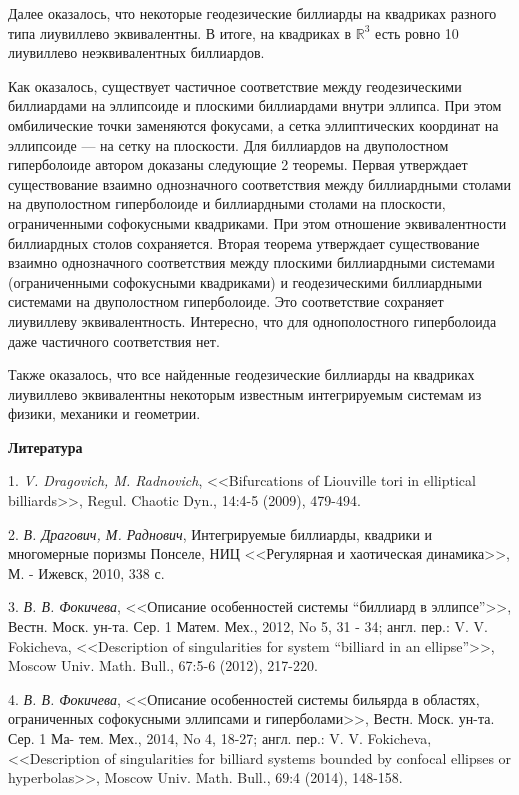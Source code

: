 Далее оказалось, что  некоторые геодезические биллиарды на квадриках разного типа лиувиллево эквивалентны.
В итоге, на квадриках в $\mathbb{R}^3$ есть ровно 10 лиувиллево неэквивалентных биллиардов.



Как оказалось, существует частичное соответствие между геодезическими биллиардами на эллипсоиде и плоскими биллиардами
внутри эллипса. При этом омбилические точки заменяются фокусами, а сетка эллиптических координат на
эллипсоиде  --- на сетку на плоскости. Для биллиардов на двуполостном гиперболоиде
автором  доказаны следующие 2 теоремы. Первая утверждает существование взаимно однозначного соответствия между
биллиардными столами на двуполостном гиперболоиде и биллиардными столами на плоскости, ограниченными софокусными квадриками. При этом
отношение эквивалентности биллиардных столов сохраняется. Вторая теорема утверждает существование
взаимно однозначного соответствия между плоскими биллиардными системами (ограниченными софокусными квадриками) и геодезическими биллиардными
системами на
двуполостном гиперболоиде. Это соответствие сохраняет лиувиллеву эквивалентность.
Интересно, что для однополостного гиперболоида даже частичного соответствия нет.

Также оказалось, что все найденные геодезические биллиарды на квадриках лиувиллево эквивалентны некоторым известным
интегрируемым системам из физики, механики и геометрии.


\smallskip \centerline {\bf Литература} \nopagebreak


1. {\it V. Dragovich, M. Radnovich}, <<Bifurcations of Liouville tori in elliptical billiards>>, Regul.
Chaotic Dyn., 14:4-5 (2009), 479-494.

2. {\it В. Драгович, М. Раднович}, Интегрируемые биллиарды, квадрики и многомерные
поризмы Понселе, НИЦ <<Регулярная и хаотическая динамика>>, М. - Ижевск, 2010,
338 с.

3. {\it В. В. Фокичева}, <<Описание особенностей системы ``биллиард в эллипсе''>>, Вестн.
Моск. ун-та. Сер. 1 Матем. Мех., 2012, No 5, 31 - 34; англ. пер.: V. V. Fokicheva,
<<Description of singularities for system ``billiard in an ellipse''>>, Moscow Univ. Math.
Bull., 67:5-6 (2012), 217-220.

4. {\it В. В. Фокичева}, <<Описание особенностей системы бильярда в областях, ограниченных
софокусными эллипсами и гиперболами>>, Вестн. Моск. ун-та. Сер. 1 Ма-
тем. Мех., 2014, No 4, 18-27; англ. пер.: V. V. Fokicheva, <<Description of singularities
for billiard systems bounded by confocal ellipses or hyperbolas>>, Moscow Univ. Math.
Bull., 69:4 (2014), 148-158.

